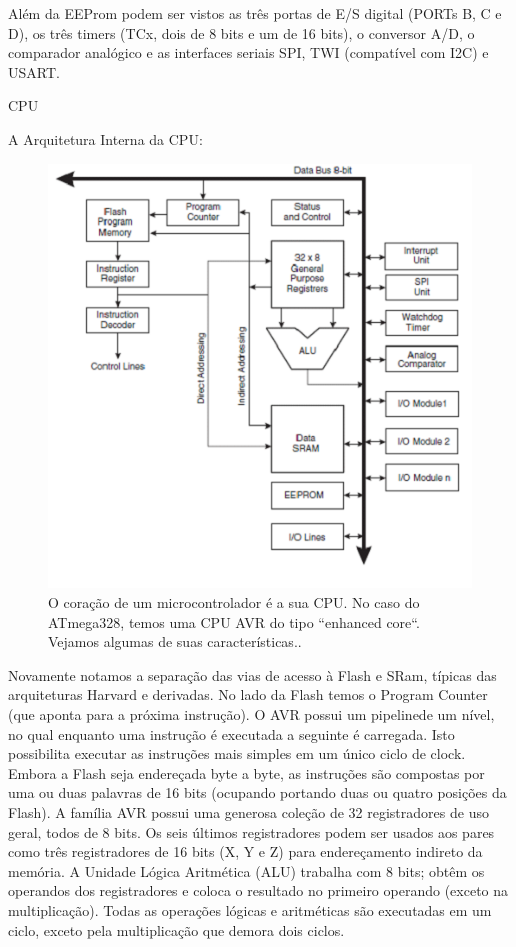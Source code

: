 Além da EEProm podem ser vistos as três portas de E/S digital (PORTs B, C e D), os três timers (TCx, dois de 8 bits e um de 16 bits), o conversor A/D, o comparador analógico e as interfaces seriais SPI, TWI (compatível com I2C) e USART. 


CPU

A Arquitetura Interna da CPU:

\FloatBarrier
 \begin{figure} [!htp]
	\centering
	\includegraphics[scale=0.6]{figuras/cpuatmega}
	\caption{O coração de um microcontrolador é a sua CPU. No caso do ATmega328, temos uma CPU AVR do tipo “enhanced core“. Vejamos algumas de suas características..}
	\label{cpu}
\end{figure}
\FloatBarrier

Novamente notamos a separação das vias de acesso à Flash e SRam, típicas das arquiteturas Harvard e derivadas.
No lado da Flash temos o Program Counter (que aponta para a próxima instrução). O AVR possui um pipelinede um nível, no qual enquanto uma instrução é executada a seguinte é carregada. Isto possibilita executar as instruções mais simples em um único ciclo de clock. Embora a Flash seja endereçada byte a byte, as instruções são compostas por uma ou duas palavras de 16 bits (ocupando portando duas ou quatro posições da Flash).
A família AVR possui uma generosa coleção de 32 registradores de uso geral, todos de 8 bits. Os seis últimos registradores podem ser usados aos pares como três registradores de 16 bits (X, Y e Z) para endereçamento indireto da memória.
A Unidade Lógica Aritmética (ALU) trabalha com 8 bits; obtêm os operandos dos registradores e coloca o resultado no primeiro operando (exceto na multiplicação). Todas as operações lógicas e aritméticas são executadas em um ciclo, exceto pela multiplicação que demora dois ciclos.


